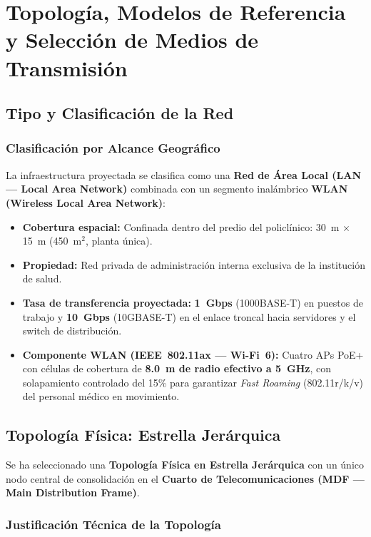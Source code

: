 \chapter{Topología, Modelos de Referencia y Selección de Medios de Transmisión}

\section{Tipo y Clasificación de la Red}

\subsection{Clasificación por Alcance Geográfico}

La infraestructura proyectada se clasifica como una \textbf{Red de Área Local (LAN --- Local Area Network)} combinada con un segmento inalámbrico \textbf{WLAN (Wireless Local Area Network)}:

\begin{itemize}[leftmargin=*]
    \item \textbf{Cobertura espacial:} Confinada dentro del predio del policlínico: 30~m $\times$ 15~m (450~m$^2$, planta única).
    \item \textbf{Propiedad:} Red privada de administración interna exclusiva de la institución de salud.
    \item \textbf{Tasa de transferencia proyectada:} \textbf{1~Gbps} (1000BASE-T) en puestos de trabajo y \textbf{10~Gbps} (10GBASE-T) en el enlace troncal hacia servidores y el switch de distribución.
    \item \textbf{Componente WLAN (IEEE~802.11ax --- Wi-Fi~6):} Cuatro APs PoE+ con células de cobertura de \textbf{8.0~m de radio efectivo a 5~GHz}, con solapamiento controlado del 15\% para garantizar \textit{Fast Roaming} (802.11r/k/v) del personal médico en movimiento.
\end{itemize}

\section{Topología Física: Estrella Jerárquica}

Se ha seleccionado una \textbf{Topología Física en Estrella Jerárquica} con un único nodo central de consolidación en el \textbf{Cuarto de Telecomunicaciones (MDF --- Main Distribution Frame)}.

\subsection{Justificación Técnica de la Topología}

